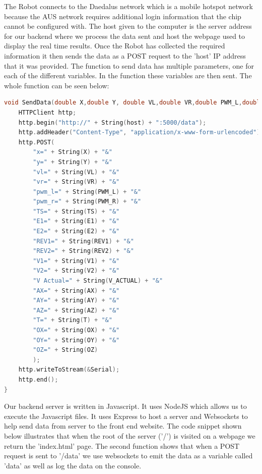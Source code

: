 \documentclass[conference]{IEEEtran}
\begin{document}
    The Robot connects to the Daedalus network which is a mobile hotspot network because
    the AUS network requires additional login information that the chip cannot be configured
    with. The host given to the computer is the server address for our backend where we
    process the data sent and host the webpage used to display the real time results. Once
    the Robot has collected the required information it then sends the data as a POST request
    to the 'host' IP address that it was provided. The function to send data has multiple parameters,
    one for each of the different variables. In the function these variables are then sent.
    The whole function can be seen below:

\begin{lstlisting}[language=C++, caption=Send Data Function]
void SendData(double X,double Y, double VL,double VR,double PWM_L,double PWM_R,double TS, double E1, double E2, double REV1, double REV2, double V1, double V2, double V_ACTUAL, double AX, double AY, double AZ, double T, double OX, double OY, double OZ){
    HTTPClient http;
    http.begin("http://" + String(host) + ":5000/data");
    http.addHeader("Content-Type", "application/x-www-form-urlencoded");
    http.POST(
        "x=" + String(X) + "&"
        "y=" + String(Y) + "&"
        "vl=" + String(VL) + "&"
        "vr=" + String(VR) + "&"
        "pwm_l=" + String(PWM_L) + "&"
        "pwm_r=" + String(PWM_R) + "&"
        "TS=" + String(TS) + "&"
        "E1=" + String(E1) + "&"
        "E2=" + String(E2) + "&"
        "REV1=" + String(REV1) + "&"
        "REV2=" + String(REV2) + "&"
        "V1=" + String(V1) + "&"
        "V2=" + String(V2) + "&"
        "V Actual=" + String(V_ACTUAL) + "&"
        "AX=" + String(AX) + "&"
        "AY=" + String(AY) + "&"
        "AZ=" + String(AZ) + "&"
        "T=" + String(T) + "&"
        "OX=" + String(OX) + "&"
        "OY=" + String(OY) + "&"
        "OZ=" + String(OZ)
        );
    http.writeToStream(&Serial);
    http.end();
}\end{lstlisting} 
    
    Our backend server is written in Javascript. It uses NodeJS which allows us to execute
    the Javascript files. It uses Express to host a server and Websockets to help send data
    from server to the front end website. The code snippet shown below illustrates that when
    the root of the server ('/') is visited on a webpage we return the 'index.html' page.
    The second function shows that when a POST request is sent to '/data' we use websockets
    to emit the data as a variable called 'data' as well as log the data on the console.
\end{document}
